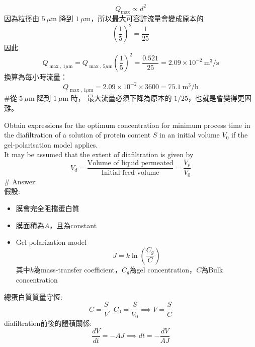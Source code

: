 ﻿\documentclass[12pt,a4paper]{article}
\begin{document}
\begin{problems}
\begin{enumerate}
\begin{equation}
    Q_{\max} \propto d^2
  \end{equation}
  因為粒徑由 $5~\mu\text{m}$ 降到 $1~\mu\text{m}$，所以最大可容許流量會變成原本的
  \begin{equation}
    \left(\frac{1}{5}\right)^2 = \frac{1}{25}
  \end{equation}
  因此
  \begin{equation}
    Q_{\max,\,1\mu\text{m}} = Q_{\max,\,5\mu\text{m}}\left(\frac{1}{5}\right)^2
    = \frac{0.521}{25}
    = 2.09\times 10^{-2}~\text{m}^3/\text{s}
  \end{equation}
  換算為每小時流量：
  \begin{equation}
    Q_{\max,\,1\mu\text{m}} = 2.09\times 10^{-2}\times 3600
    = 75.1~\text{m}^3/\text{h}
  \end{equation}
  \#從 $5~\mu\text{m}$ 降到 $1~\mu\text{m}$ 時，
  最大流量必須下降為原本的 $1/25$，也就是會變得更困難。
\end{enumerate}
Obtain expressions for the optimum concentration for minimum process time in the diafiltration of a solution of protein content $S$ in an initial volume $V_0$ if the gel-polarisation model applies.\\
It may be assumed that the extent of diafiltration is given by
\begin{equation}
V_d = \frac{\text{Volume of liquid permeated}}{\text{Initial feed volume}} = \frac{V_p}{V_0}
\end{equation}
\# Answer:\\
假設:
\begin{itemize}
  \item 膜會完全阻擋蛋白質
  \item 膜面積為$A$，且為constant
  \item Gel-polarization model
  \begin{equation}
    J = k \ln \left(\frac{C_g}{C}\right) \label{eq:gel_polarization}
  \end{equation}
  其中$k$為mass-transfer coefficient，$C_g$為gel concentration，$C$為Bulk concentration
\end{itemize}
總蛋白質質量守恆:
\begin{equation}
  C = \frac{S}{V},~ C_0 = \frac{S}{V_0} \implies V = \frac{S}{C}
\end{equation}
diafiltration前後的體積關係:
\begin{equation}
  \frac{dV}{dt} = -A J \implies dt = -\frac{dV}{AJ}  \label{eq:dt_dV}
\end{equation}

\end{problems}
\end{document}
